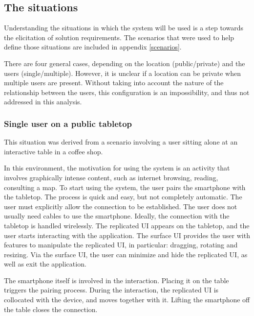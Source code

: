 \subsection{The situations}
\label{sec:scenarios}

Understanding the situations in which the system will be used is a step towards the elicitation of solution requirements.
The scenarios that were used to help define those situations are included in appendix \ref{scenarios}.

There are four general cases, depending on the location (public/private) and the users (single/multiple).
However, it is unclear if a location can be private when multiple users are present.
Without taking into account the nature of the relationship between the users, this configuration is an impossibility, and thus not addressed in this analysis.

\subsubsection{Single user on a public tabletop}

This situation was derived from a scenario involving a user sitting alone at an interactive table in a coffee shop.

In this environment, the motivation for using the system is an activity that involves graphically intense content, such as 
internet browsing, reading, consulting a map.
To start using the system, the user pairs the smartphone with the tabletop.
The process is quick and easy, but not completely automatic.
The user must explicitly allow the connection to be established.
The user does not usually need cables to use the smartphone.
Ideally, the connection with the tabletop is handled wirelessly.
The replicated UI appears on the tabletop, and the user starts interacting with the application.
The surface UI provides the user with features to manipulate the replicated UI, in particular: dragging, rotating and resizing.
Via the surface UI, the user can minimize and hide the replicated UI, as well as exit the application.

The smartphone itself is involved in the interaction.
Placing it on the table triggers the pairing process.
During the interaction, the replicated UI is collocated with the device, and moves together with it.
Lifting the smartphone off the table closes the connection.


